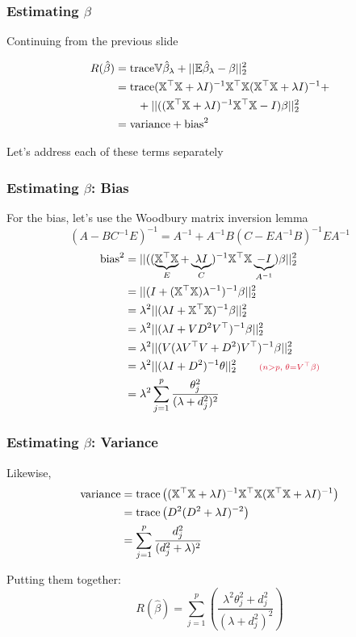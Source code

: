 \documentclass[12pt]{beamer}
\newcommand{\parenthetical}[2]{#1  \scriptstyle \alr{( #2)}}
\begin{document}
\begin{frame}
\frametitle{Estimating $\beta$}
Continuing from the previous slide 

\begin{align}
R(\hat\beta) 
& = 
\textrm{trace} \mathbb{V} \hat\beta_{\lambda} + ||\mathbb{E}\hat\beta_{\lambda} - \beta||_2^2 \\
& = 
\textrm{trace} (\mathbb{X}^{\top}\mathbb{X} + \lambda I)^{-1}\mathbb{X}^{\top}\mathbb{X}(\mathbb{X}^{\top}\mathbb{X} + \lambda I)^{-1}+ \\
& \qquad  +||((\mathbb{X}^{\top}\mathbb{X} + \lambda I)^{-1}\mathbb{X}^{\top}\mathbb{X} - I)\beta||_2^2 \\
& = \textrm{variance} + \textrm{bias}^2
\end{align}

Let's address each of these terms separately
\end{frame}

\begin{frame}
\frametitle{Estimating $\beta$: Bias}
For the bias, let's use the Woodbury matrix inversion lemma
\[
(A - BC^{-1}E)^{-1} = A^{-1} + A^{-1} B(C - EA^{-1}B)^{-1} E A^{-1}
\]
\begin{align}
\textrm{bias}^2 
& = ||((\underbrace{\X^{\top}\X}_{E} + \underbrace{\lambda I}_{C})^{-1}\X^{\top}\X \underbrace{- I}_{A^{-1}})\beta||_2^2 \\
& = ||(I + (\X^{\top}\X)\lambda^{-1})^{-1}\beta||_2^2 \\
& = \lambda^2||(\lambda I + \X^{\top}\X)^{-1}\beta||_2^2 \\
& = \lambda^2||(\lambda I + V D^2 V^{\top})^{-1}\beta||_2^2 \\
& =  \lambda^2||(V(\lambda V^{\top}V + D^2 )V^{\top})^{-1}\beta||_2^2 \\
& = \lambda^2||(\lambda I + D^2 )^{-1}\theta||_2^2 \parenthetical{\qquad}{n>p, \; \theta=V^{\top}\beta}\\
& = \lambda^2\sum_{j=1}^p \frac{\theta_j^2}{(\lambda  + d_j^2)^2}
\end{align}
\end{frame}

\begin{frame}
\frametitle{Estimating $\beta$: Variance}
Likewise,
\begin{align}
\textrm{variance} 
& = \textrm{trace} \left( (\mathbb{X}^{\top}\mathbb{X} + \lambda I)^{-1}\mathbb{X}^{\top}\mathbb{X}(\mathbb{X}^{\top}\mathbb{X} + \lambda I)^{-1}\right) \\
& = \textrm{trace} \left( D^2(D^2 + \lambda I)^{-2} \right)\\
& = \sum_{j=1}^p \frac{d_j^2}{(d_j^2 +\lambda)^2}
\end{align}
\vsp

Putting them together: 
\[
R(\hat\beta) 
 = 
\sum_{j=1}^p \left(\frac{\lambda^2 \theta_j^2 + d_j^2}{(\lambda  + d_j^2)^2}\right)
\]
\end{frame}
\end{document}
